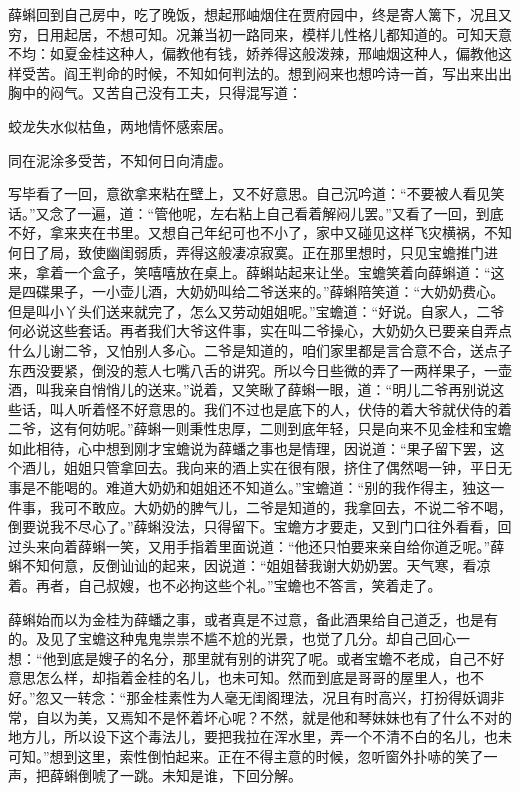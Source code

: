 \begin{parag}
    薛蝌回到自己房中，吃了晚饭，想起邢岫烟住在贾府园中，终是寄人篱下，况且又穷，日用起居，不想可知。况兼当初一路同来，模样儿性格儿都知道的。可知天意不均：如夏金桂这种人，偏教他有钱，娇养得这般泼辣，邢岫烟这种人，偏教他这样受苦。阎王判命的时候，不知如何判法的。想到闷来也想吟诗一首，写出来出出胸中的闷气。又苦自己没有工夫，只得混写道：
\end{parag}


\begin{poem}
    \begin{pl}
        蛟龙失水似枯鱼，两地情怀感索居。
    \end{pl}


    \begin{pl}
        同在泥涂多受苦，不知何日向清虚。
    \end{pl}
\end{poem}


\begin{parag}
    写毕看了一回，意欲拿来粘在壁上，又不好意思。自己沉吟道：“不要被人看见笑话。”又念了一遍，道：“管他呢，左右粘上自己看着解闷儿罢。”又看了一回，到底不好，拿来夹在书里。又想自己年纪可也不小了，家中又碰见这样飞灾横祸，不知何日了局，致使幽闺弱质，弄得这般凄凉寂寞。正在那里想时，只见宝蟾推门进来，拿着一个盒子，笑嘻嘻放在桌上。薛蝌站起来让坐。宝蟾笑着向薛蝌道：“这是四碟果子，一小壶儿酒，大奶奶叫给二爷送来的。”薛蝌陪笑道：“大奶奶费心。但是叫小丫头们送来就完了，怎么又劳动姐姐呢。”宝蟾道：“好说。自家人，二爷何必说这些套话。再者我们大爷这件事，实在叫二爷操心，大奶奶久已要亲自弄点什么儿谢二爷，又怕别人多心。二爷是知道的，咱们家里都是言合意不合，送点子东西没要紧，倒没的惹人七嘴八舌的讲究。所以今日些微的弄了一两样果子，一壶酒，叫我亲自悄悄儿的送来。”说着，又笑瞅了薛蝌一眼，道：“明儿二爷再别说这些话，叫人听着怪不好意思的。我们不过也是底下的人，伏侍的着大爷就伏侍的着二爷，这有何妨呢。”薛蝌一则秉性忠厚，二则到底年轻，只是向来不见金桂和宝蟾如此相待，心中想到刚才宝蟾说为薛蟠之事也是情理，因说道：“果子留下罢，这个酒儿，姐姐只管拿回去。我向来的酒上实在很有限，挤住了偶然喝一钟，平日无事是不能喝的。难道大奶奶和姐姐还不知道么。”宝蟾道：“别的我作得主，独这一件事，我可不敢应。大奶奶的脾气儿，二爷是知道的，我拿回去，不说二爷不喝，倒要说我不尽心了。”薛蝌没法，只得留下。宝蟾方才要走，又到门口往外看看，回过头来向着薛蝌一笑，又用手指着里面说道：“他还只怕要来亲自给你道乏呢。”薛蝌不知何意，反倒讪讪的起来，因说道：“姐姐替我谢大奶奶罢。天气寒，看凉着。再者，自己叔嫂，也不必拘这些个礼。”宝蟾也不答言，笑着走了。
\end{parag}


\begin{parag}
    薛蝌始而以为金桂为薛蟠之事，或者真是不过意，备此酒果给自己道乏，也是有的。及见了宝蟾这种鬼鬼祟祟不尴不尬的光景，也觉了几分。却自己回心一想：“他到底是嫂子的名分，那里就有别的讲究了呢。或者宝蟾不老成，自己不好意思怎么样，却指着金桂的名儿，也未可知。然而到底是哥哥的屋里人，也不好。”忽又一转念：“那金桂素性为人毫无闺阁理法，况且有时高兴，打扮得妖调非常，自以为美，又焉知不是怀着坏心呢？不然，就是他和琴妹妹也有了什么不对的地方儿，所以设下这个毒法儿，要把我拉在浑水里，弄一个不清不白的名儿，也未可知。”想到这里，索性倒怕起来。正在不得主意的时候，忽听窗外扑哧的笑了一声，把薛蝌倒唬了一跳。未知是谁，下回分解。
\end{parag}